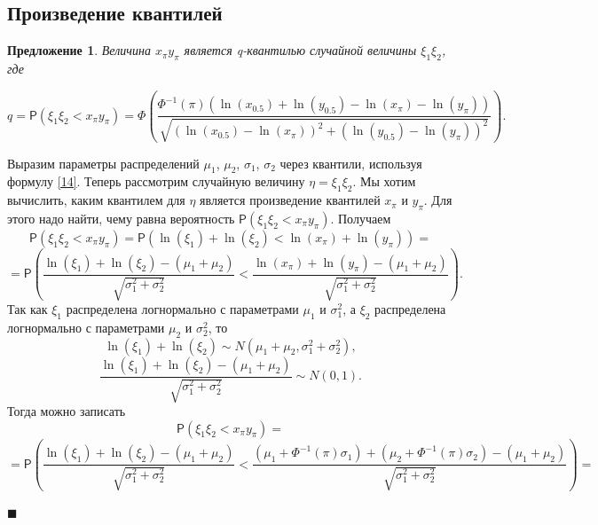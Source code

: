 \documentclass[12pt]{article}
\newtheorem{proposition}[theorem]{Предложение}
\newenvironment{Proof}{\par\noindent{\bf Доказательство.}}{\hfill$\scriptstyle\blacksquare$}
\begin{document}
	\subsection{Произведение квантилей}
	\begin{proposition}
		Величина $x_{\pi}y_{\pi}$ является q-квантилью случайной величины $\xi_{1}\xi_{2}$, где
		
		\begin{equation}
			q = \mathsf{P}(\xi_{1}\xi_{2}< x_{\pi}y_{\pi}) =\Phi\left(\frac{\Phi^{-1}(\pi)(\ln(x_{0.5})+\ln(y_{0.5})-\ln(x_{\pi})-\ln(y_{\pi}))}{\sqrt{(\ln(x_{0.5})-\ln(x_{\pi}))^{2}+(\ln(y_{0.5})-\ln(y_{\pi}))^{2}}}\right). \label{20}
		\end{equation} 
	\end{proposition}
	\begin{Proof}
		Выразим параметры распределений $\mu_{1}$, $\mu_{2}$, $\sigma_{1}$, $\sigma_{2}$ через квантили, используя формулу \eqref{14}. Теперь рассмотрим случайную величину $\eta = \xi_{1}\xi_{2}$. Мы хотим вычислить, каким квантилем для $\eta$ является произведение квантилей $x_{\pi}$ и $y_{\pi}$. Для этого надо найти, чему равна вероятность $\mathsf{P}(\xi_{1}\xi_{2}< x_{\pi}y_{\pi})$. Получаем
		\begin{equation*}
			\mathsf{P}(\xi_{1}\xi_{2}< x_{\pi}y_{\pi}) = \mathsf{P}(\ln(\xi_{1})+\ln(\xi_{2})<\ln(x_{\pi})+\ln(y_{\pi}))=
		\end{equation*}
		\begin{equation*}
			=\mathsf{P}\left(\displaystyle{\frac{\ln(\xi_{1})+\ln(\xi_{2})-(\mu_{1}+\mu_{2})}{\sqrt{\sigma_{1}^{2}+\sigma_{2}^{2}}}}<\displaystyle{\frac{\ln(x_{\pi})+\ln(y_{\pi})-(\mu_{1}+\mu_{2})}{\sqrt{\sigma_{1}^{2}+\sigma_{2}^{2}}}}\right).
		\end{equation*}
		Так как $\xi_{1}$ распределена логнормально с параметрами $\mu_{1}$ и $\sigma_{1}^{2}$, а $\xi_{2}$ распределена логнормально с параметрами $\mu_{2}$ и $\sigma_{2}^{2}$, то
		\begin{equation*} 
			\ln(\xi_{1})+\ln(\xi_{2})\sim N(\mu_{1}+\mu_{2}, \sigma_{1}^{2}+\sigma_{2}^{2}),
		\end{equation*}
		\begin{equation*}
			\frac{\ln(\xi_{1})+\ln(\xi_{2})-(\mu_{1}+\mu_{2})}{\sqrt{\sigma_{1}^{2}+\sigma_{2}^{2}}} \sim N(0,1).
		\end{equation*}
		Тогда можно записать
		\begin{equation*}
			\mathsf{P}(\xi_{1}\xi_{2}< x_{\pi}y_{\pi}) =
		\end{equation*}
		\begin{equation*}
			=\mathsf{P}\left(\displaystyle{\frac{\ln(\xi_{1})+\ln(\xi_{2})-(\mu_{1}+\mu_{2})}{\sqrt{\sigma_{1}^{2}+\sigma_{2}^{2}}}}<\displaystyle{\frac{(\mu_{1}+\Phi^{-1}(\pi)\sigma_{1})+(\mu_{2}+\Phi^{-1}(\pi)\sigma_{2})-(\mu_{1}+\mu_{2})}{\sqrt{\sigma_{1}^{2}+\sigma_{2}^{2}}}}\right)=
		\end{equation*}
		

\end{Proof}
\end{document}
